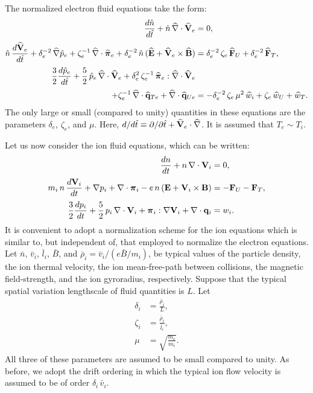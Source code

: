 \documentclass[notitlepage,12pt]{article}
\newcommand{\bpi}{\mbox{\boldmath$\pi$}}
\begin{document}
The normalized electron fluid equations take the form:
\begin{align}
\frac{d\hat{n}}{d\hat{t}} + \hat{n}\,\widehat{\nabla}\cdot\widehat{\bf V}_e &=0,\label{e3.113a}\\[0.5ex]
\hat{n}\,\frac{d\widehat{\bf V}_e}{d\hat{t}} +
\delta_e^{-2}\,\widehat{\nabla}\hat{p}_e +\zeta_e^{-1}\,\widehat{\nabla}
\cdot\widehat{\bpi}_e  
+ \delta_e^{-2}\,\hat{n}\,(\widehat{\bf E} + \widehat{\bf V}_e
\times\widehat{\bf B}) &= \delta_e^{-2}\,\zeta_e\,\widehat{\bf F}_U +\delta_e^{-2}\,\widehat{\bf F}_T, \\[0.5ex]
\frac{3}{2}\frac{d\hat{p}_e}{d\hat{t}} + \frac{5}{2}\,
\hat{p}_e\,\widehat{\nabla}\cdot\widehat{\bf V}_e + \delta_e^{2}\,
\zeta_e^{-1}\,\widehat{\bpi}_e : \widehat{\nabla}\cdot\widehat{\bf V}_e&\nonumber\label{e3.113c}\\[0.5ex] 
+\zeta_e^{-1} \,\widehat{\nabla}\cdot\widehat{\bf q}_{Te}
 +\widehat{\nabla}\cdot\widehat{\bf q}_{Ue} 
&= -\delta_e^{-2}\,\zeta_e\,\mu^2\,\widehat{w}_i + \zeta_e\,
\widehat{w}_U +\widehat{w}_T.
\end{align}
The only large or small (compared to unity) quantities in these equations are the
parameters $\delta_e$, $\zeta_e$, and $\mu$. 
Here, $d/d\hat{t}\equiv\partial /\partial\hat{t} +
 \widehat{\bf V}_e\cdot\widehat{\nabla}$. It is assumed that $T_e\sim T_i$.

Let us now consider the ion fluid equations, which can be written:
\begin{align}
\frac{dn}{dt} + n\,\nabla\cdot{\bf V}_i &= 0,\\[0.5ex]
m_i\, n\,\frac{d {\bf V}_i}{dt} + \nabla p_i + \nabla\cdot \bpi_i - e\, n\,
({\bf E} + {\bf V}_i\times {\bf B})& =- {\bf F}_U -{\bf F}_T,\\[0.5ex]
\frac{3}{2}\frac{d p_i}{dt} + \frac{5}{2}\,p_i\,\nabla \cdot {\bf V}_i
+ \bpi_i:\nabla{\bf V}_i+ \nabla\cdot{\bf q}_i & =w_i.
\end{align}
It is convenient to adopt a normalization scheme for the ion equations
which is similar to, but independent of, that employed to normalize the
electron equations. Let  $\bar{n}$, $\bar{v}_i$, $\bar{l}_i$, $\bar{B}$,
and $\bar{\rho}_i =\bar{ v}_i/(e\bar{B}/m_i)$,  be typical values
of the particle density, the ion  thermal velocity, the ion
mean-free-path between collisions,  the magnetic field-strength, and the
ion gyroradius,  respectively. 
Suppose that 
the typical spatial variation lengthscale of fluid quantities is $L$. Let
 \begin{align}
\delta_i &= \frac{\bar{\rho}_i}{L},\\[0.5ex]
\zeta_i &= \frac{\bar{\rho}_i}{\bar{l}_i},\\[0.5ex]
\mu &= \sqrt{\frac{m_e}{m_i}}.
\end{align}
All three of these parameters are assumed to be  small 
compared to unity.  As before, we adopt the drift ordering in which the typical ion flow velocity is assumed to be of order $\delta_i\,\bar{v}_i$. 
\end{document}
